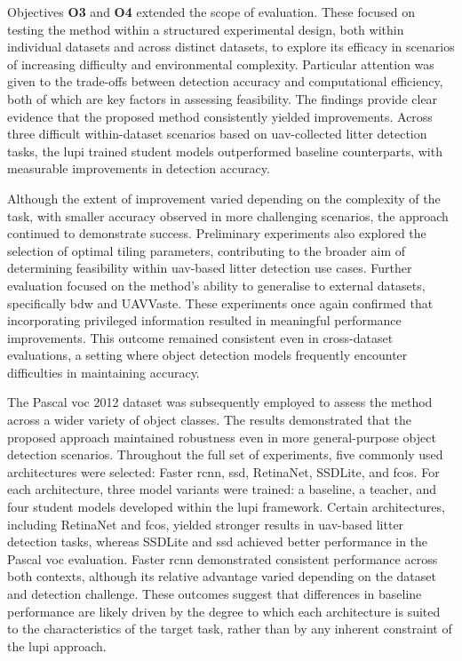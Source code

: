Objectives \textbf{O3} and \textbf{O4} extended the scope of evaluation. These focused on testing the method within a structured experimental design, both within individual datasets and across distinct datasets, to explore its efficacy in scenarios of increasing difficulty and environmental complexity. Particular attention was given to the trade-offs between detection accuracy and computational efficiency, both of which are key factors in assessing feasibility. The findings provide clear evidence that the proposed method consistently yielded improvements. Across three difficult within-dataset scenarios based on \gls{uav}-collected litter detection tasks, the \gls{lupi} trained student models outperformed baseline counterparts, with measurable improvements in detection accuracy.

Although the extent of improvement varied depending on the complexity of the task, with smaller accuracy observed in more challenging scenarios, the approach continued to demonstrate success. Preliminary experiments also explored the selection of optimal tiling parameters, contributing to the broader aim of determining feasibility within \gls{uav}-based litter detection use cases. Further evaluation focused on the method’s ability to generalise to external datasets, specifically \gls{bdw} and UAVVaste. These experiments once again confirmed that incorporating privileged information resulted in meaningful performance improvements. This outcome remained consistent even in cross-dataset evaluations, a setting where object detection models frequently encounter difficulties in maintaining accuracy.

The Pascal \gls{voc} 2012 dataset was subsequently employed to assess the method across a wider variety of object classes. The results demonstrated that the proposed approach maintained robustness even in more general-purpose object detection scenarios. Throughout the full set of experiments, five commonly used architectures were selected: Faster \gls{rcnn}, \gls{ssd}, RetinaNet, SSDLite, and \gls{fcos}. For each architecture, three model variants were trained: a baseline, a teacher, and four student models developed within the \gls{lupi} framework. Certain architectures, including RetinaNet and \gls{fcos}, yielded stronger results in \gls{uav}-based litter detection tasks, whereas SSDLite and \gls{ssd} achieved better performance in the Pascal \gls{voc} evaluation. Faster \gls{rcnn} demonstrated consistent performance across both contexts, although its relative advantage varied depending on the dataset and detection challenge. These outcomes suggest that differences in baseline performance are likely driven by the degree to which each architecture is suited to the characteristics of the target task, rather than by any inherent constraint of the \gls{lupi} approach.

